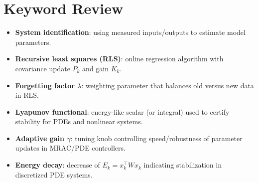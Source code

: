 \section{Keyword Review}
\begin{vocabulary}
\begin{itemize}[leftmargin=*]
    \item \textbf{System identification}: using measured inputs/outputs to estimate model parameters.
    \item \textbf{Recursive least squares (RLS)}: online regression algorithm with covariance update $P_k$ and gain $K_k$.
    \item \textbf{Forgetting factor $\lambda$}: weighting parameter that balances old versus new data in RLS.
    \item \textbf{Lyapunov functional}: energy-like scalar (or integral) used to certify stability for PDEs and nonlinear systems.
    \item \textbf{Adaptive gain $\gamma$}: tuning knob controlling speed/robustness of parameter updates in MRAC/PDE controllers.
    \item \textbf{Energy decay}: decrease of $E_k = x_k^\top W x_k$ indicating stabilization in discretized PDE systems.
\end{itemize}
\end{vocabulary}
